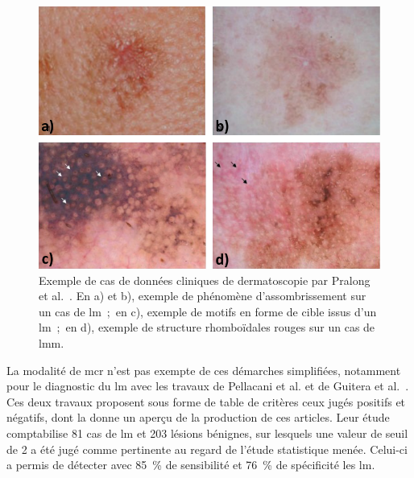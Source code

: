 \begin{figure}[H]
    \begin{center}
        \includegraphics[width=\linewidth]{contents/chapter_4/resources/example_dermoscopy_pattern.pdf}
        \caption{Exemple de cas de données cliniques de dermatoscopie par Pralong et al.~\cite{Pralong2012}. En a) et b), exemple de phénomène d'assombrissement sur un cas de \gls{lm}~;~en c), exemple de motifs en forme de cible issus d'un \gls{lm}~;~en d), exemple de structure rhomboïdales rouges sur un cas de \gls{lmm}.}
        \label{fig:example_dermoscopy_pattern}
    \end{center} 
\end{figure}\par

La modalité de \gls{mcr} n'est pas exempte de ces démarches simplifiées, notamment pour le diagnostic du \gls{lm} avec les travaux de Pellacani et al. et de Guitera et al.~\cite{Pellacani2007, Guitera2010}. Ces deux travaux proposent sous forme de table de critères ceux jugés positifs et négatifs, dont la  donne un aperçu de la production de ces articles. Leur étude comptabilise 81 cas de \gls{lm} et 203 lésions bénignes, sur lesquels une valeur de seuil de 2 a été jugé comme pertinente au regard de l'étude statistique menée. Celui-ci a permis de détecter avec 85~\% de sensibilité et 76~\% de spécificité les \gls{lm}.\par


